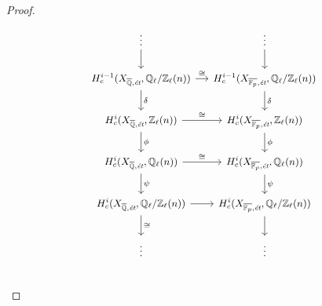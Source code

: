 \documentclass{article}
\numberwithin{equation}{section}
\begin{document}
\begin{proposition}
\begin{proof}
    \begin{equation}
      \label{eqn:Zl-Ql-Ql/Zl-les}
      \begin{tikzcd}[column sep=small, font=\small]
        \vdots \ar{d} & \vdots \ar{d} \\
        H_c^{i-1} (X_{\overline{\QQ},\text{\it ét}}, \QQ_\ell/\ZZ_\ell (n)) \ar{d}{\delta}\ar{r}{\cong} & H_c^{i-1} (X_{\overline{\FF_p},\text{\it ét}}, \QQ_\ell/\ZZ_\ell (n))  \ar{d}{\delta} \\
        H_c^i (X_{\overline{\QQ},\text{\it ét}}, \ZZ_\ell (n)) \ar{d}{\phi}\ar{r}{\cong} & H_c^i (X_{\overline{\FF_p},\text{\it ét}}, \ZZ_\ell (n)) \ar{d}{\phi} \\
        H_c^i (X_{\overline{\QQ},\text{\it ét}}, \QQ_\ell (n)) \ar{d}{\psi}\ar{r}{\cong} & H_c^i (X_{\overline{\FF_p},\text{\it ét}}, \QQ_\ell (n)) \ar{d}{\psi} \\
        H_c^i (X_{\overline{\QQ},\text{\it ét}}, \QQ_\ell/\ZZ_\ell (n)) \ar{r}\ar{d}{\cong} & H_c^i (X_{\overline{\FF_p},\text{\it ét}}, \QQ_\ell/\ZZ_\ell (n)) \ar{d} \\
        \vdots & \vdots \\
      \end{tikzcd}
\end{equation}


\end{proof}
\end{proposition}
\end{document}
